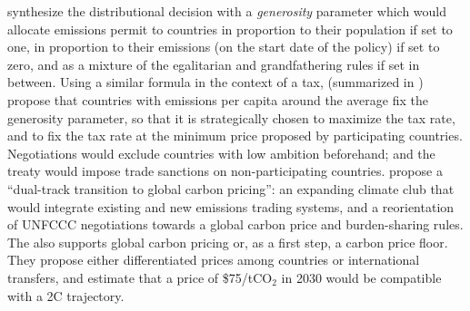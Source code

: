  synthesize the distributional decision with a \textit{generosity} parameter which would allocate emissions permit to countries in proportion to their population if set to one, in proportion to their emissions (on the start date of the policy) if set to zero, and as a mixture of the egalitarian and grandfathering rules if set in between. Using a similar formula in the context of a tax,  (summarized in ) propose that countries with emissions per capita around the average fix the generosity parameter, so that it is strategically chosen to maximize the tax rate, and to fix the tax rate at the minimum price proposed by participating countries. Negotiations would exclude countries with low ambition beforehand; and the treaty would impose trade sanctions on non-participating countries. %
 propose a ``dual-track transition to global carbon pricing'': an expanding climate club that would integrate existing and new emissions trading systems, and a reorientation of UNFCCC negotiations towards a global carbon price and burden-sharing rules. 
The  also supports global carbon pricing or, as a first step, a carbon price floor. They propose either differentiated prices among countries or international transfers, and estimate that a price of \$75/tCO$_\text{2}$ in 2030 would be compatible with a 2\textdegree{}C trajectory. %

